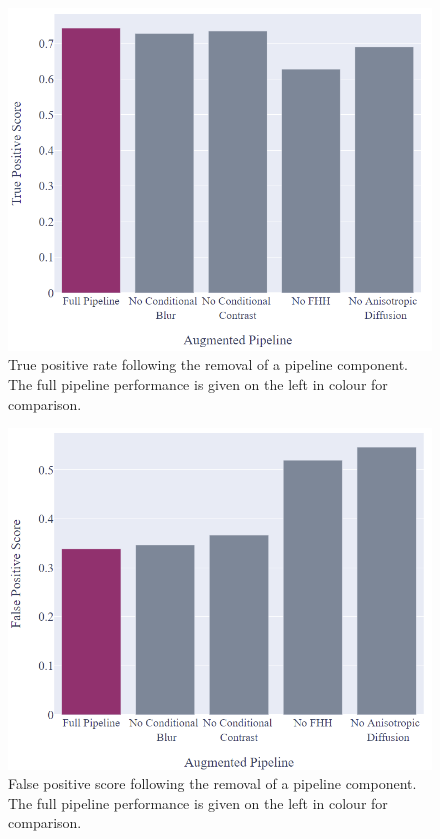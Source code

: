 \documentclass[conference]{IEEEtran}
\begin{document}
\begin{figure}
\centerline{\includegraphics[width=0.9\linewidth]{exp2_1.PNG}}
\caption{True positive rate following the removal of a pipeline component. The full pipeline performance is given on the left in colour for comparison.}
\label{fig:ablationTrue}
\end{figure}

\begin{figure}
\centerline{\includegraphics[width=0.9\linewidth]{exp2_2.PNG}}
\caption{False positive score following the removal of a pipeline component. The full pipeline performance is given on the left in colour for comparison.}
\label{fig:ablationFalse}
\end{figure}
\end{document}

